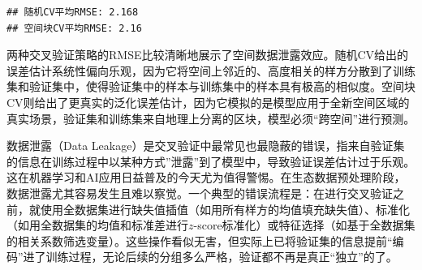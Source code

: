 \documentclass[
  twoside,12pt,fontset=none]{ctexbook}
\newenvironment{Shaded}{\begin{snugshade}}{\end{snugshade}}
\newcommand{\AttributeTok}[1]{\textcolor[rgb]{0.13,0.29,0.53}{#1}}
\newcommand{\CommentTok}[1]{\textcolor[rgb]{0.56,0.35,0.01}{\textit{#1}}}
\newcommand{\ConstantTok}[1]{\textcolor[rgb]{0.56,0.35,0.01}{#1}}
\newcommand{\ControlFlowTok}[1]{\textcolor[rgb]{0.13,0.29,0.53}{\textbf{#1}}}
\newcommand{\DecValTok}[1]{\textcolor[rgb]{0.00,0.00,0.81}{#1}}
\newcommand{\FunctionTok}[1]{\textcolor[rgb]{0.13,0.29,0.53}{\textbf{#1}}}
\newcommand{\NormalTok}[1]{#1}
\newcommand{\OtherTok}[1]{\textcolor[rgb]{0.56,0.35,0.01}{#1}}
\newcommand{\SpecialCharTok}[1]{\textcolor[rgb]{0.81,0.36,0.00}{\textbf{#1}}}
\newcommand{\StringTok}[1]{\textcolor[rgb]{0.31,0.60,0.02}{#1}}
\begin{document}
\begin{Shaded}
\end{Shaded}

\begin{verbatim}
## 随机CV平均RMSE: 2.168 
## 空间块CV平均RMSE: 2.16
\end{verbatim}

两种交叉验证策略的RMSE比较清晰地展示了空间数据泄露效应。随机CV给出的误差估计系统性偏向乐观，因为它将空间上邻近的、高度相关的样方分散到了训练集和验证集中，使得验证集中的样本与训练集中的样本具有极高的相似度。空间块CV则给出了更真实的泛化误差估计，因为它模拟的是模型应用于全新空间区域的真实场景，验证集和训练集来自地理上分离的区块，模型必须``跨空间''进行预测。

数据泄露（Data Leakage）是交叉验证中最常见也最隐蔽的错误，指来自验证集的信息在训练过程中以某种方式''泄露''到了模型中，导致验证误差估计过于乐观。这在机器学习和AI应用日益普及的今天尤为值得警惕。在生态数据预处理阶段，数据泄露尤其容易发生且难以察觉。一个典型的错误流程是：在进行交叉验证之前，就使用全数据集进行缺失值插值（如用所有样方的均值填充缺失值）、标准化（如用全数据集的均值和标准差进行\(z\)-score标准化）或特征选择（如基于全数据集的相关系数筛选变量）。这些操作看似无害，但实际上已将验证集的信息提前``编码''进了训练过程，无论后续的分组多么严格，验证都不再是真正``独立''的了。
\end{document}
